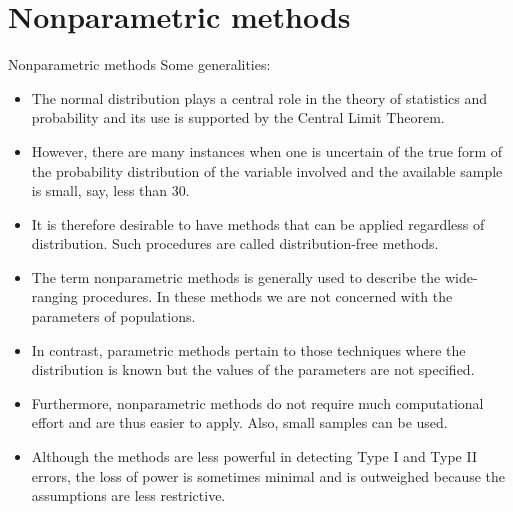 \documentclass[8pt]{beamer}
\renewcommand{\emph}[1]{\textcolor{myorange}{#1}}
\begin{document}
\section{Nonparametric methods}
\begin{frame}{Nonparametric methods}
    Some generalities:
    \begin{itemize}
        \item The \emph{normal distribution} plays a central role in the theory of statistics and probability and its use is supported by the \emph{Central Limit Theorem}.
        \item However, there are many instances when one is uncertain of the true form of the \emph{probability distribution} of the variable involved and the available sample is small, say, less than 30.
        \item It is therefore desirable to have methods that can be applied regardless of distribution. Such procedures are called \alert{distribution-free methods}.
        \item The term \alert{nonparametric methods} is generally used to describe the wide-ranging procedures. In these methods we are not concerned with the parameters of populations.
        \item In contrast, \alert{parametric methods} pertain to those techniques where the distribution is known but the values of the parameters are not specified.
        \item Furthermore, \alert{nonparametric methods} do not require much computational effort and are thus easier to apply. Also, small samples can be used.
        \item Although the methods are less powerful in detecting \emph{Type I and Type II errors}, the \emph{loss of power} is sometimes minimal and is outweighed because the assumptions are less restrictive.
    \end{itemize}
\end{frame}
\end{document}
